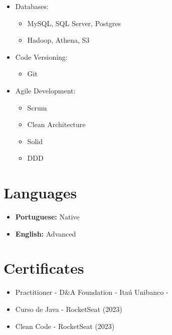 \documentclass[a4paper,10pt]{article}
\begin{document}
\begin{minipage}[t]{0.3\textwidth}
\begin{itemize}[left=0pt, label={}]
        \item Databases:
        \begin{itemize}
            \item MySQL, SQL Server, Postgres
            \item Hadoop, Athena, S3
        \end{itemize}
        
        \item Code Versioning:
        \begin{itemize}
            \item Git
        \end{itemize}
        
        \item Agile Development:
        \begin{itemize}
            \item Scrum
            \item Clean Architecture
            \item Solid
            \item DDD
        \end{itemize}
    \end{itemize}

    \section*{\faLanguage \space Languages}
    \begin{itemize}
        \item \textbf{Portuguese:} Native
        \item \textbf{English:} Advanced
    \end{itemize}

    \section*{\faCertificate \space Certificates}
    \begin{itemize}[left=0pt]
        \item Practitioner - D\&A Foundation - Itaú Unibanco -
        \item Curso de Java - RocketSeat (2023)
        \item Clean Code - RocketSeat (2023)
    \end{itemize}
\end{minipage}
\end{document}

